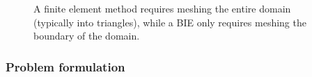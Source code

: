 %
\begin{figure}
  \caption{\label{fig:fem_vs_bie} A finite element method requires
  meshing the entire domain (typically into triangles), while a BIE
  only requires meshing the boundary of the domain.}
\end{figure}

\subsubsection{Problem formulation}


